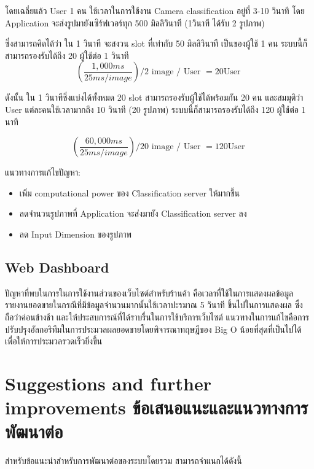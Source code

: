 โดยเฉลี่ยแล้ว User 1 คน ใช้เวลาในการใช้งาน Camera classification อยู่ที่ 3-10 วินาที
โดย Application จะส่งรูปมายังเซิร์ฟเวอร์ทุก 500 มิลลิวินาที (1วินาที ได้รับ 2 รูปภาพ)

ซึ่งสามารถคิดได้ว่า ใน 1 วินาที จะสงวน slot ที่เท่ากับ 50 มิลลิวินาที เป็นของผู้ใช้ 1 คน
ระบบนี้ก็สามารถรองรับได้ถึง 20 ผู้ใช้ต่อ 1 วินาที
\begin{equation}
    ({\frac {1,000 ms}{25 ms / image}} )  / 2 \text{ image / User }  = 20 \text{User }
\end{equation}

ดังนั้น ใน 1 วินาทีซึ่งแบ่งได้ทั้งหมด 20  slot สามารถรองรับผู้ใช้ได้พร้อมกัน 20 คน
และสมมุติว่า User แต่ละคนใช้เวลามากถึง 10 วินาที (20 รูปภาพ) ระบบนี้ก็สามารถรองรับได้ถึง 120 ผู้ใช้ต่อ 1 นาที

\begin{equation}
    ({\frac {60,000 ms}{25 ms / image}} )   / 20 \text{ image / User }  = 120 \text{User }
\end{equation}

แนวทางการแก้ไขปัญหา:

\begin{itemize}
    \item เพิ่ม computational power ของ Classification server ให้มากขึ้น
    \item ลดจำนวนรูปภาพที่ Application จะส่งมายัง Classification server ลง
    \item ลด Input Dimension ของรูปภาพ
\end{itemize}

\subsection{Web Dashboard}
ปัญหาที่พบในการในการใช้งานส่วนของเว็บไซต์สำหรับร้านค้า คือเวลาที่ใช้ในการแสดงผลข้อมูลรายงานยอดขายในกรณีที่มีข้อมูลจำนวนมากนั้นใช้เวลาปะรมาณ 5 วินาที
ขึ้นไปในการแสดงผล ซึ่งถือว่าค่อนข้างช้า และให้ประสบการณ์ที่ได้ราบรื่นในการใช้บริการเว็บไซต์ แนวทางในการแก้ไขคือการปรับปรุงอัลกอริทึมในการประมวลผลยอดขายโดยพิจารณาทฤษฎีของ
Big O น้อยที่สุดที่เป็นไปได้ เพื่อให้การประมวลรวดเร็วยิ่งขึ้น



\section{\ifenglish%
      Suggestions and further improvements
  \else%
      ข้อเสนอแนะและแนวทางการพัฒนาต่อ
  \fi
 }
 สำหรับข้อแนะนำสำหรับการพัฒนาต่อของระบบโดยรวม สามารถจำแนกได้ดังนี้

